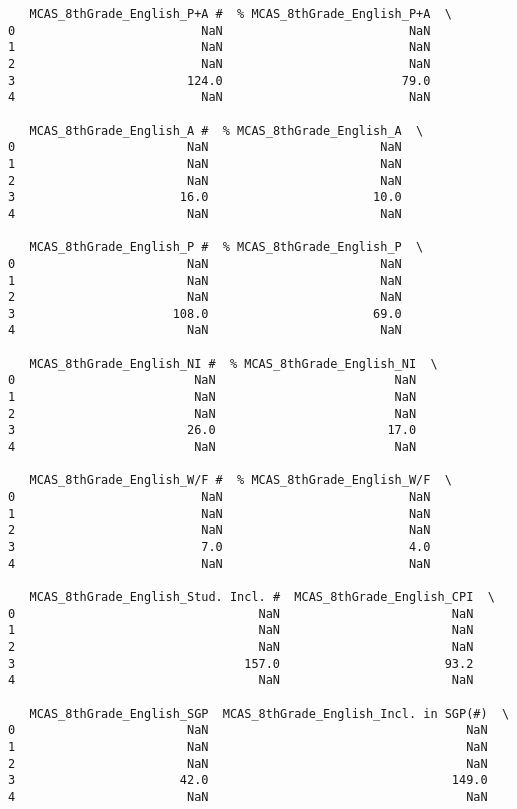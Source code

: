 \documentclass[11pt]{article}
\begin{document}
\begin{verbatim}
   MCAS_8thGrade_English_P+A #  % MCAS_8thGrade_English_P+A  \
0                          NaN                          NaN   
1                          NaN                          NaN   
2                          NaN                          NaN   
3                        124.0                         79.0   
4                          NaN                          NaN   

   MCAS_8thGrade_English_A #  % MCAS_8thGrade_English_A  \
0                        NaN                        NaN   
1                        NaN                        NaN   
2                        NaN                        NaN   
3                       16.0                       10.0   
4                        NaN                        NaN   

   MCAS_8thGrade_English_P #  % MCAS_8thGrade_English_P  \
0                        NaN                        NaN   
1                        NaN                        NaN   
2                        NaN                        NaN   
3                      108.0                       69.0   
4                        NaN                        NaN   

   MCAS_8thGrade_English_NI #  % MCAS_8thGrade_English_NI  \
0                         NaN                         NaN   
1                         NaN                         NaN   
2                         NaN                         NaN   
3                        26.0                        17.0   
4                         NaN                         NaN   

   MCAS_8thGrade_English_W/F #  % MCAS_8thGrade_English_W/F  \
0                          NaN                          NaN   
1                          NaN                          NaN   
2                          NaN                          NaN   
3                          7.0                          4.0   
4                          NaN                          NaN   

   MCAS_8thGrade_English_Stud. Incl. #  MCAS_8thGrade_English_CPI  \
0                                  NaN                        NaN   
1                                  NaN                        NaN   
2                                  NaN                        NaN   
3                                157.0                       93.2   
4                                  NaN                        NaN   

   MCAS_8thGrade_English_SGP  MCAS_8thGrade_English_Incl. in SGP(#)  \
0                        NaN                                    NaN   
1                        NaN                                    NaN   
2                        NaN                                    NaN   
3                       42.0                                  149.0   
4                        NaN                                    NaN   


\end{verbatim}
\end{document}
